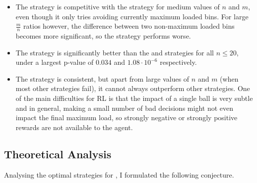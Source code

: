 \begin{itemize}
    \item The \LocalRewardOptimiser strategy is competitive with the \DP strategy for medium values of $n$ and $m$, even though it only tries avoiding currently maximum loaded bins. For large $\frac{m}{n}$ ratios however, the difference between two non-maximum loaded bins becomes more significant, so the strategy performs worse.
    \item The \DQN strategy is significantly better than the \MeanThinning and \Threshold strategies for all $n\leq 20$, under a largest p-value of $0.034$ and $1.08\cdot 10^{-6}$ respectively. 
    \item The \DQN strategy is consistent, but apart from large values of $n$ and $m$ (when most other strategies fail), it cannot always outperform other strategies. One of the main difficulties for RL is that the impact of a single ball is very subtle and in general, making a small number of bad decisions might not even impact the final maximum load, so strongly negative or strongly positive rewards are not available to the agent.
\end{itemize}






\subsection{Theoretical Analysis}

Analysing the optimal strategies for \TwoThinning, I formulated the following conjecture.

